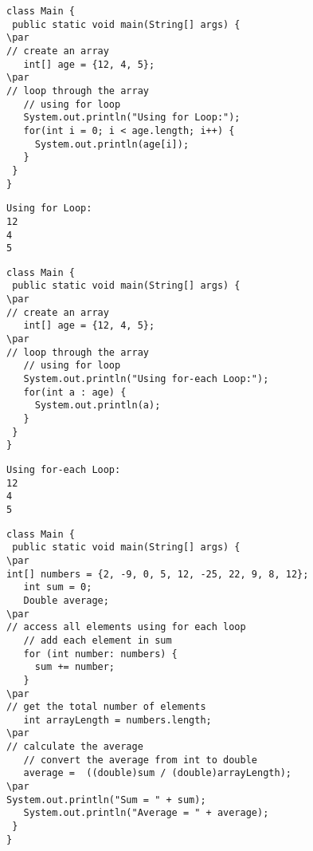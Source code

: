\documentclass{book}
\def\lthtmlcheckvsize{\ifdim\ht\sizebox<\vsize 
  \ifdim\wd\sizebox<\hsize\expandafter\hfill\fi \expandafter\vfill
  \else\expandafter\vss\fi}%
\begin{document}
{\newpage\clearpage
{}%
\begin{lstlisting}
class Main {
 public static void main(String[] args) {
\par
// create an array
   int[] age = {12, 4, 5};
\par
// loop through the array
   // using for loop
   System.out.println("Using for Loop:");
   for(int i = 0; i < age.length; i++) {
     System.out.println(age[i]);
   }
 }
}
\end{lstlisting}%
\lthtmlfigureZ
\lthtmlcheckvsize\clearpage}

{\newpage\clearpage
{}%
\begin{lstlisting}
Using for Loop:
12
4
5
\end{lstlisting}%
\lthtmlfigureZ
\lthtmlcheckvsize\clearpage}

{\newpage\clearpage
{}%
\begin{lstlisting}
class Main {
 public static void main(String[] args) {
\par
// create an array
   int[] age = {12, 4, 5};
\par
// loop through the array
   // using for loop
   System.out.println("Using for-each Loop:");
   for(int a : age) {
     System.out.println(a);
   }
 }
}
\end{lstlisting}%
\lthtmlfigureZ
\lthtmlcheckvsize\clearpage}

{\newpage\clearpage
{}%
\begin{lstlisting}
Using for-each Loop:
12
4
5
\end{lstlisting}%
\lthtmlfigureZ
\lthtmlcheckvsize\clearpage}

{\newpage\clearpage
{}%
\begin{lstlisting}
class Main {
 public static void main(String[] args) {
\par
int[] numbers = {2, -9, 0, 5, 12, -25, 22, 9, 8, 12};
   int sum = 0;
   Double average;
\par
// access all elements using for each loop
   // add each element in sum
   for (int number: numbers) {
     sum += number;
   }
\par
// get the total number of elements
   int arrayLength = numbers.length;
\par
// calculate the average
   // convert the average from int to double
   average =  ((double)sum / (double)arrayLength);
\par
System.out.println("Sum = " + sum);
   System.out.println("Average = " + average);
 }
}
\end{lstlisting}%
\lthtmlfigureZ
\lthtmlcheckvsize\clearpage}
\end{document}
